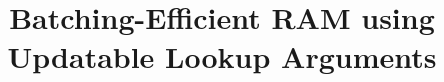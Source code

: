 \documentclass[sigconf]{acmart}
\begin{document}
	
	\title{Batching-Efficient RAM using Updatable Lookup Arguments}
	
%	
%	
%	
%	
%	
%	
%	
%	
	
\end{document}
